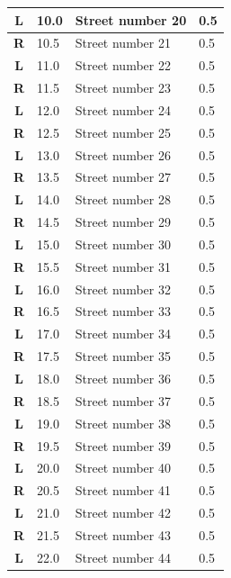 \documentclass[11pt]{article}
\begin{document}
\begin{center}
\begin{supertabular}{|c|p{0.30in}|p{2.25in}|l|}
 \textbf{L} &  10.0 & Street number 20 &   0.5 \\ \hline
{} \textbf{R} &  10.5 & Street number 21 &   0.5 \\ \hline
 \textbf{L} &  11.0 & Street number 22 &   0.5 \\ \hline
{} \textbf{R} &  11.5 & Street number 23 &   0.5 \\ \hline
 \textbf{L} &  12.0 & Street number 24 &   0.5 \\ \hline
{} \textbf{R} &  12.5 & Street number 25 &   0.5 \\ \hline
 \textbf{L} &  13.0 & Street number 26 &   0.5 \\ \hline
{} \textbf{R} &  13.5 & Street number 27 &   0.5 \\ \hline
 \textbf{L} &  14.0 & Street number 28 &   0.5 \\ \hline
{} \textbf{R} &  14.5 & Street number 29 &   0.5 \\ \hline
 \textbf{L} &  15.0 & Street number 30 &   0.5 \\ \hline
{} \textbf{R} &  15.5 & Street number 31 &   0.5 \\ \hline
 \textbf{L} &  16.0 & Street number 32 &   0.5 \\ \hline
{} \textbf{R} &  16.5 & Street number 33 &   0.5 \\ \hline
 \textbf{L} &  17.0 & Street number 34 &   0.5 \\ \hline
{} \textbf{R} &  17.5 & Street number 35 &   0.5 \\ \hline
 \textbf{L} &  18.0 & Street number 36 &   0.5 \\ \hline
{} \textbf{R} &  18.5 & Street number 37 &   0.5 \\ \hline
 \textbf{L} &  19.0 & Street number 38 &   0.5 \\ \hline
{} \textbf{R} &  19.5 & Street number 39 &   0.5 \\ \hline
 \textbf{L} &  20.0 & Street number 40 &   0.5 \\ \hline
{} \textbf{R} &  20.5 & Street number 41 &   0.5 \\ \hline
 \textbf{L} &  21.0 & Street number 42 &   0.5 \\ \hline
{} \textbf{R} &  21.5 & Street number 43 &   0.5 \\ \hline
 \textbf{L} &  22.0 & Street number 44 &   0.5 \\ \hline

\end{supertabular}
\end{center}
\end{document}
